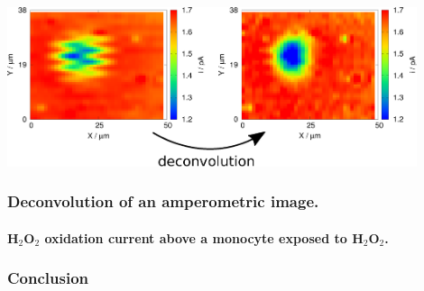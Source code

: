 \documentclass{beamer}
\begin{document}
\begin{frame}
        \centering
        \includegraphics[width=0.9\textwidth]{monocyte.eps}
        \frametitle{Deconvolution of an amperometric image.}
        \framesubtitle{H$_2$O$_2$ oxidation current above a monocyte exposed to H$_2$O$_2$.}
\end{frame}



\begin{frame}
\frametitle{Conclusion}
\scriptsize
\begin{enumerate}

\end{enumerate}
\end{frame}

\end{document}
